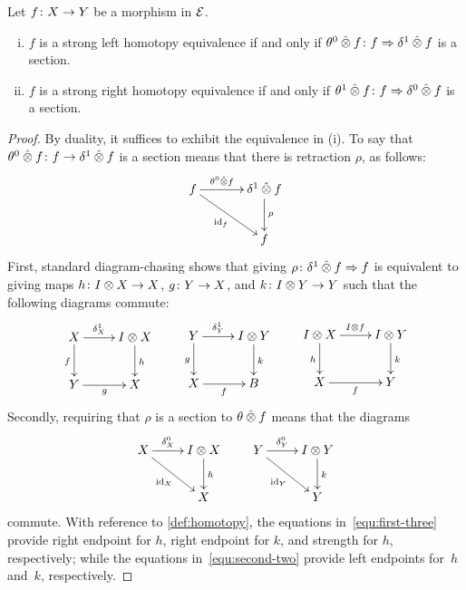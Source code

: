 \documentclass[reqno,10pt,a4paper,oneside]{amsart}
\begin{document}
\begin{proposition}
\label{strong-h-equiv-as-section}
Let $f \colon X  \to Y$ be a morphism in $\mathcal{E}$.
\begin{enumerate}[(i)]
\item $f$ is a strong left homotopy equivalence if and only if $\theta^{0} \mathbin{\hat{\otimes}} f \colon f \Rightarrow \delta^1 \mathbin{\hat{\otimes}} f$ is a section.
\item $f$ is a strong right homotopy equivalence if and only if $\theta^{1} \mathbin{\hat{\otimes}} f \colon f \Rightarrow  \delta^0 \mathbin{\hat{\otimes}} f$ is a section.
\end{enumerate}
\end{proposition}

\begin{proof}
By duality, it suffices to exhibit the equivalence in (i). To say that $\theta^{0} \mathbin{\hat{\otimes}} f \colon f \to \delta^1 \mathbin{\hat{\otimes}} f$ is a section means that
there is retraction $\rho$, as follows:
\[
\xymatrix@C+1em{
  f
  \ar[r]^-{\thetal \hatotimes f}
  \ar[dr]_{\id_f} &   \rcyl \hatotimes f \ar[d]^{\rho} \\
&   f
}
\]
First, standard diagram-chasing shows that giving $\rho \colon \delta^1 \mathbin{\hat{\otimes}} f \Rightarrow f$ is equivalent  to giving maps $h \colon I \otimes X \to X$, $g \colon Y \to X$, and $k \colon I \otimes Y \to Y$ such that the following diagrams commute:
\begin{equation}
\label{equ:first-three}
\xycenter{
X \ar[r]^-{\rcyl_X}  \ar[d]_f & \interval \otimes X \ar[d]^{h} \\
Y \ar[r]_{g} & X}  \qquad
\xycenter{
Y \ar[r]^-{\rcyl_Y} \ar[d]_g & \interval \otimes Y \ar[d]^{k} \\
X \ar[r]_f & B} \qquad
\xycenter{ 
\interval \otimes X \ar[d]_h \ar[r]^{I \otimes f} & \interval \otimes Y \ar[d]^k \\
X \ar[r]_{f} & Y }
\end{equation}
Secondly, requiring that $\rho$ is a section to $\theta \mathbin{\hat{\otimes}} f$ means that the diagrams
\begin{equation}
\label{equ:second-two}
\xycenter{
X \ar[r]^-{\lcyl_X} \ar[dr]_{\id_X} & \interval \otimes X \ar[d]^h \\ 
 & X } \qquad
 \xycenter{
 Y \ar[r]^-{\lcyl_Y}  \ar[dr]_{\id_Y} & \interval \otimes Y \ar[d]^{k} \\
  & Y} 
\end{equation}
commute. With reference to \cref{def:homotopy}, the equations in~\eqref{equ:first-three} provide right endpoint for $h$, 
right endpoint for $k$, and strength for $h$, respectively; while the equations in~\eqref{equ:second-two} provide left endpoints for~$h$ and~$k$, respectively.
\end{proof}
\end{document}
